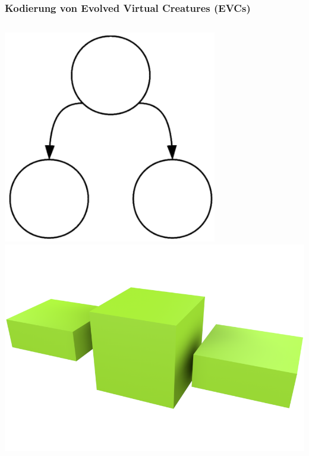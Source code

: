 \documentclass{beamer}
\begin{document}
\begin{frame}
	\frametitle{Kodierung von Evolved Virtual Creatures (EVCs)}
	\begin{columns}[c]
		\centering
		\includegraphics[width=0.7\textwidth]{img/g1.png} \pause
		\centering
		\includegraphics[width=\textwidth]{img/1.png}
	\end{columns}
\end{frame}
\end{document}

